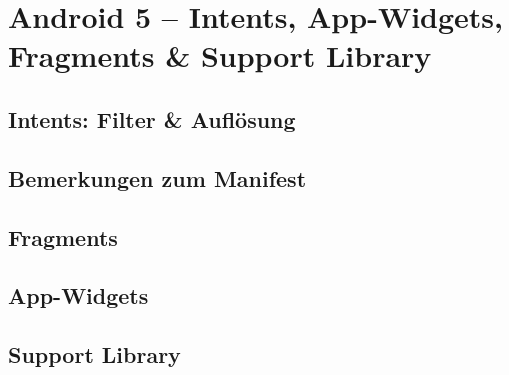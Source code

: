 \chapter{Android 5 – Intents, App-Widgets, Fragments \& Support Library}

\section{Intents: Filter \& Auflösung}

\section{Bemerkungen zum Manifest}

\section{Fragments}

\section{App-Widgets}

\section{Support Library}